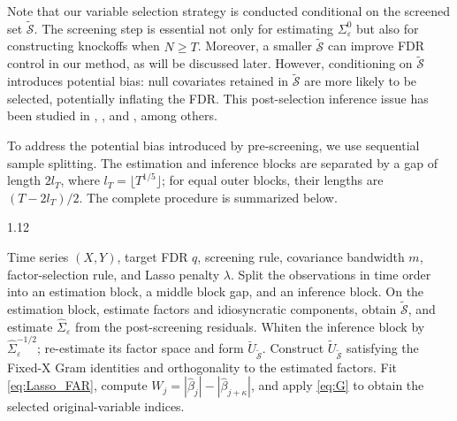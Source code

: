 ﻿\documentclass[12pt]{article}
\newcommand{\0}{\mbox{\bf 0}}
\theoremstyle{plain}%
\theoremstyle{definition}
\begin{document}
{Note that our variable selection strategy is conducted conditional on the screened set $\widetilde{\mathcal{S}}$. The screening step is essential not only for estimating $\Sigma^{0}_{\varepsilon}$ but also for constructing  knockoffs when $N \geq T$. Moreover, a smaller $\widetilde{\mathcal{S}}$ can improve FDR control in our method, as will be discussed later. However, conditioning on $\widetilde{\mathcal{S}}$ introduces potential bias: null covariates retained in $\widetilde{\mathcal{S}}$ are more likely to be selected, potentially inflating the FDR. This post-selection inference issue has been studied in \citet{LeeSunSunTaylor2016}, \citet{KuchibhotlaKolassaKuffner2022}, and \citet{RasinesYoung2023}, among others.


{\color{minorrevisionred}
To address the potential bias introduced by pre-screening, we use sequential
sample splitting. The estimation and inference blocks are separated by a gap
of length $2l_T$, where $l_T=\lfloor T^{1/5}\rfloor$; for equal outer blocks,
their lengths are $(T-2l_T)/2$. The complete procedure is summarized below.
}

\begin{algorithm}[H]
\color{minorrevisionred}
\caption{FAR-Knockoff}
\label{alg:far_knockoff}
\begin{spacing}{1.12}
\small
\begin{algorithmic}[1]
\REQUIRE Time series $(X,Y)$, target FDR $q$, screening rule, covariance
bandwidth $m$, factor-selection rule, and Lasso penalty $\lambda$.
\STATE Split the observations in time order into an estimation block, a
middle block gap, and an inference block.
\STATE On the estimation block, estimate factors and idiosyncratic components,
obtain $\widetilde{\mathcal S}$, and estimate
$\widehat\Sigma_\varepsilon$ from the post-screening residuals.
\STATE Whiten the inference block by
$\widehat\Sigma_\varepsilon^{-1/2}$; re-estimate its factor space and form
$\breve U_{\widetilde{\mathcal S}}$.
\STATE Construct $\widetilde U_{\widetilde{\mathcal S}}$ satisfying the
Fixed-X Gram identities and orthogonality to the estimated factors.
\STATE Fit \eqref{eq:Lasso_FAR}, compute
$W_j=|\widehat\beta_j|-|\widehat\beta_{j+\kappa}|$, and apply
\eqref{eq:G} to obtain the selected original-variable indices.
\end{algorithmic}
\end{spacing}
\vspace{1.2em}
\end{algorithm}

}
\end{document}
